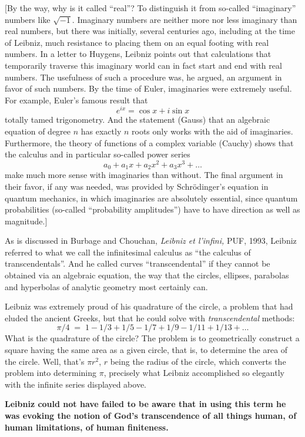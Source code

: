 \documentclass[12pt]{book}
\begin{document}
{\footnotesize
[By the way,
why is it called ``real''? To distinguish it from so-called ``imaginary'' numbers like $\sqrt{-1}$.
Imaginary numbers are neither more nor less imaginary than real numbers, but there was initially,
several centuries ago, including at the time of Leibniz, much resistance to placing them on 
an equal footing with real numbers.  In a letter to Huygens, Leibniz points out that calculations
that temporarily traverse this imaginary world can in fact start and end with real numbers.
The usefulness of such a procedure was, he argued, an argument in favor of such numbers.
By the time of Euler, imaginaries were extremely useful. For example, Euler's famous result
that 
\[
   e^{i x} = \cos x + i \sin x 
\] 
totally tamed trigonometry.
And the statement (Gauss)
that an algebraic equation of degree $n$ has exactly $n$ roots only works with the 
aid of imaginaries. Furthermore, the theory of functions of a complex variable (Cauchy)
shows that the calculus and in particular so-called power series
\[
   a_0 + a_1 x + a_2 x^2 + a_3 x^3 + \ldots
\] 
make much more sense with imaginaries than without.
The final argument in their favor, if any was needed, was provided by Schr\"odinger's equation
in quantum mechanics, in which imaginaries are absolutely essential, since quantum probabilities
(so-called ``probability amplitudes'') have to have direction as well as magnitude.]
}
 
As is discussed in Burbage and Chouchan, \emph{Leibniz et l'infini,} PUF, 1993,
Leibniz referred to what we call the infinitesimal calculus as ``the calculus of
transcendentals''. And he called curves ``transcendental'' if they cannot be obtained via
an algebraic equation, the way that the circles, ellipses, parabolas and hyperbolas
of analytic geometry most certainly can.  
 
Leibniz was extremely proud of his quadrature of the circle, a problem that had eluded
the ancient Greeks, but that he could solve with \emph{transcendental} methods:
\[
 \pi/4 \; = \; 1 - 1/3 + 1/5 - 1/7 + 1/9 - 1/11 + 1/13 + \ldots
\] 
What is the quadrature of the circle? 
The problem is to geometrically construct a square having the same area as a given circle, that
is, to determine the area of the circle. Well, that's $\pi r^2$, $r$ being the radius
of the circle, which converts the problem into determining $\pi$, precisely what Leibniz accomplished
so elegantly with the infinite series displayed above.
 
\textbf{
Leibniz could not have failed to be aware that in using this term he was evoking
the notion of God's transcendence of all things human, of human limitations, of
human finiteness.
}
 
\end{document}

